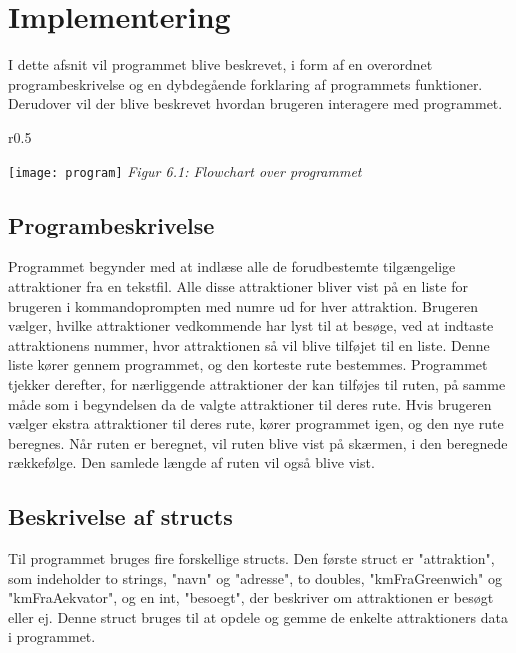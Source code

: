 \chapter{Implementering}
I dette afsnit vil programmet blive beskrevet, i form af en overordnet programbeskrivelse og en dybdegående forklaring af programmets funktioner. Derudover vil der blive beskrevet hvordan brugeren interagere med programmet. 

\begin{wrapfigure}{r}{0.5\textwidth}
	\vspace{-40pt}
	\begin{center}
		\texttt{[image: program]}\newline
		\textit{Figur 6.1: Flowchart over programmet}
	\end{center}
	\vspace{0pt}
	\vspace{0pt}
\end{wrapfigure}

\section{Programbeskrivelse}
Programmet begynder med at indlæse alle de forudbestemte tilgængelige attraktioner fra en tekstfil. Alle disse attraktioner bliver vist på en liste for brugeren i kommandoprompten med numre ud for hver attraktion. Brugeren vælger, hvilke attraktioner vedkommende har lyst til at besøge, ved at indtaste attraktionens nummer, hvor attraktionen så vil blive tilføjet til en liste. Denne liste kører gennem programmet, og den korteste rute bestemmes. Programmet tjekker derefter, for nærliggende attraktioner der kan tilføjes til ruten, på samme måde som i begyndelsen da de valgte attraktioner til deres rute. Hvis brugeren vælger ekstra attraktioner til deres rute, kører programmet igen, og den nye rute beregnes.  Når ruten er beregnet, vil ruten blive vist på skærmen, i den beregnede rækkefølge. Den samlede længde af ruten vil også blive vist.

\section{Beskrivelse af structs}
Til programmet bruges fire forskellige structs. Den første struct er "attraktion", som indeholder to strings, "navn" og "adresse", to doubles, "kmFraGreenwich" og "kmFraAekvator", og en int, "besoegt", der beskriver om attraktionen er besøgt eller ej. Denne struct bruges til at opdele og gemme de enkelte attraktioners data i programmet.\newline

